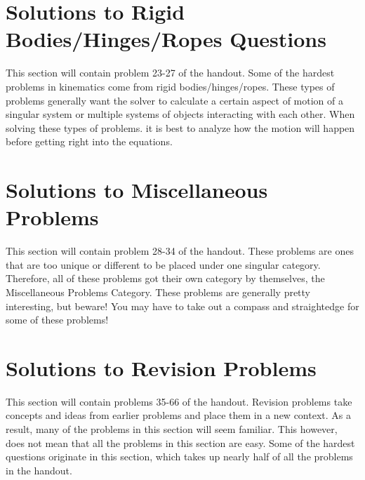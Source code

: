 \documentclass[11pt]{article}
\begin{document}







\newpage
\section{Solutions to Rigid Bodies/Hinges/Ropes Questions}
This section will contain problem 23-27 of the handout. Some of the hardest problems in kinematics come from rigid bodies/hinges/ropes. These types of problems generally want the solver to calculate a certain aspect of motion of a singular system or multiple systems of objects interacting with each other. When solving these types of problems. it is best to analyze how the motion will happen before getting right into the equations. 

\newpage





\newpage
\section{Solutions to Miscellaneous Problems}
This section will contain problem 28-34 of the handout. These problems are ones that are too unique or different to be placed under one singular category. Therefore, all of these problems got their own category by themselves, the Miscellaneous Problems Category. These problems are generally pretty interesting, but beware! You may have to take out a compass and straightedge for some of these problems!









\newpage
\section{Solutions to Revision Problems}
This section will contain problems 35-66 of the handout. Revision problems take concepts and ideas from earlier problems and place them in a new context. As a result, many of the problems in this section will seem familiar. This however, does not mean that all the problems in this section are easy. Some of the hardest questions originate in this section, which takes up nearly half of all the problems in the handout.


































\end{document}
